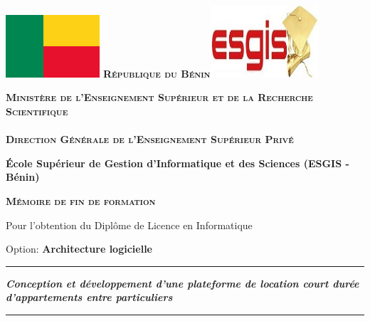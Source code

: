 \begin{titlepage}

\includegraphics[width=3.5cm]{images/benin.png}\qquad\qquad\qquad
\textsc{\textbf{République du Bénin}}\qquad\qquad\quad \includegraphics[width=4cm]{images/esgis.jpg}

\begin{center}
\textsc{\textbf{Ministère de l'Enseignement Supérieur et de la Recherche Scientifique}}
\\$ $\\ \textsc{\textbf{Direction Générale de l'Enseignement Supérieur Privé}}
\end{center}

\vspace*{1cm}

\begin{center}
\bf{\large{\'Ecole Supérieur de Gestion d’Informatique et des Sciences (ESGIS - Bénin)}}
\end{center}

\parindent=0pt
\small {} 

\hspace{4cm}


\begin{center}
\textsc{\large{\textbf{Mémoire de fin de formation}}} 
\end{center}

\begin{center} Pour l'obtention du Diplôme de Licence en Informatique\end{center}

\begin{center}Option: \bf{Architecture logicielle}
\end{center}

\vspace*{1cm}

\rule{17cm}{3pt}
\begin{center}\bfseries\Large
   \textit{Conception et développement d’une plateforme  de location court durée d’appartements entre particuliers} 
\end{center}
\rule{17cm}{3pt}


\end{titlepage}
